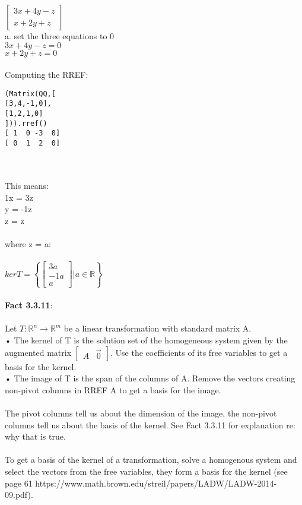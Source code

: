 \documentclass{article}
\begin{document}
$\left[\begin{matrix} 
3x + 4y -z \\ x + 2y + z \end{matrix}\right]$
\\
a. set the three equations to 0\\
$3x+4y-z = 0$\\
$x+2y+z = 0$\\
\\
Computing the RREF:
\begin{verbatim}
(Matrix(QQ,[
[3,4,-1,0],
[1,2,1,0]
])).rref()
[ 1  0 -3  0]
[ 0  1  2  0]
\end{verbatim}\\
\\
This means: \\
1x = 3z\\
y = -1z \\
z = z\\
\\
where z = a:\\
\\
$kerT = \left\{ \begin{bmatrix} 3a\\-1a\\a\end{bmatrix} \Bigg| a \in \mathbb{R} \right\}$\\
\\
\noindent \textbf{Fact 3.3.11}:\\
\\
Let $T: \mathbb{R}^n \to \mathbb{R}^m$ be a linear transformation with standard matrix
A.\\
• The kernel of T is the solution set of the homogeneous system given by
the augmented matrix $\left[\begin{array}{c|c}A&\vec 0\end{array}\right]$. Use the coeﬀicients of its free variables
to get a basis for the kernel.\\
• The image of T is the span of the columns of A. Remove the vectors
creating non-pivot columns in RREF A to get a basis for the image.\\
\\
The pivot columns tell us about the dimension of the image, the non-pivot columns tell us about the basis of the kernel. See Fact 3.3.11 for explanation re: why that is true. \\
\\
To get a basis of the kernel of a transformation, solve a homogenous system and select the vectors from the free variables, they form a basis for the kernel (see page 61 https://www.math.brown.edu/streil/papers/LADW/LADW-2014-09.pdf).
\end{document}
